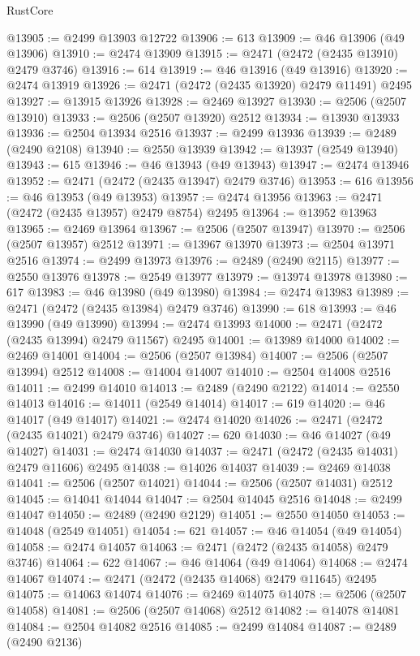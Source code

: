 \begin{lexlean}{RustCore}
\begin{coremodule}
@13905 := @2499 @13903 @12722
@13906 := 613
@13909 := @46 @13906 (@49 @13906)
@13910 := @2474 @13909
@13915 := @2471 (@2472 (@2435 @13910) @2479 @3746)
@13916 := 614
@13919 := @46 @13916 (@49 @13916)
@13920 := @2474 @13919
@13926 := @2471 (@2472 (@2435 @13920) @2479 @11491) @2495
@13927 := @13915 @13926
@13928 := @2469 @13927
@13930 := @2506 (@2507 @13910)
@13933 := @2506 (@2507 @13920) @2512
@13934 := @13930 @13933
@13936 := @2504 @13934 @2516
@13937 := @2499 @13936
@13939 := @2489 (@2490 @2108)
@13940 := @2550 @13939
@13942 := @13937 (@2549 @13940)
@13943 := 615
@13946 := @46 @13943 (@49 @13943)
@13947 := @2474 @13946
@13952 := @2471 (@2472 (@2435 @13947) @2479 @3746)
@13953 := 616
@13956 := @46 @13953 (@49 @13953)
@13957 := @2474 @13956
@13963 := @2471 (@2472 (@2435 @13957) @2479 @8754) @2495
@13964 := @13952 @13963
@13965 := @2469 @13964
@13967 := @2506 (@2507 @13947)
@13970 := @2506 (@2507 @13957) @2512
@13971 := @13967 @13970
@13973 := @2504 @13971 @2516
@13974 := @2499 @13973
@13976 := @2489 (@2490 @2115)
@13977 := @2550 @13976
@13978 := @2549 @13977
@13979 := @13974 @13978
@13980 := 617
@13983 := @46 @13980 (@49 @13980)
@13984 := @2474 @13983
@13989 := @2471 (@2472 (@2435 @13984) @2479 @3746)
@13990 := 618
@13993 := @46 @13990 (@49 @13990)
@13994 := @2474 @13993
@14000 := @2471 (@2472 (@2435 @13994) @2479 @11567) @2495
@14001 := @13989 @14000
@14002 := @2469 @14001
@14004 := @2506 (@2507 @13984)
@14007 := @2506 (@2507 @13994) @2512
@14008 := @14004 @14007
@14010 := @2504 @14008 @2516
@14011 := @2499 @14010
@14013 := @2489 (@2490 @2122)
@14014 := @2550 @14013
@14016 := @14011 (@2549 @14014)
@14017 := 619
@14020 := @46 @14017 (@49 @14017)
@14021 := @2474 @14020
@14026 := @2471 (@2472 (@2435 @14021) @2479 @3746)
@14027 := 620
@14030 := @46 @14027 (@49 @14027)
@14031 := @2474 @14030
@14037 := @2471 (@2472 (@2435 @14031) @2479 @11606) @2495
@14038 := @14026 @14037
@14039 := @2469 @14038
@14041 := @2506 (@2507 @14021)
@14044 := @2506 (@2507 @14031) @2512
@14045 := @14041 @14044
@14047 := @2504 @14045 @2516
@14048 := @2499 @14047
@14050 := @2489 (@2490 @2129)
@14051 := @2550 @14050
@14053 := @14048 (@2549 @14051)
@14054 := 621
@14057 := @46 @14054 (@49 @14054)
@14058 := @2474 @14057
@14063 := @2471 (@2472 (@2435 @14058) @2479 @3746)
@14064 := 622
@14067 := @46 @14064 (@49 @14064)
@14068 := @2474 @14067
@14074 := @2471 (@2472 (@2435 @14068) @2479 @11645) @2495
@14075 := @14063 @14074
@14076 := @2469 @14075
@14078 := @2506 (@2507 @14058)
@14081 := @2506 (@2507 @14068) @2512
@14082 := @14078 @14081
@14084 := @2504 @14082 @2516
@14085 := @2499 @14084
@14087 := @2489 (@2490 @2136)

\end{coremodule}
\end{lexlean}
